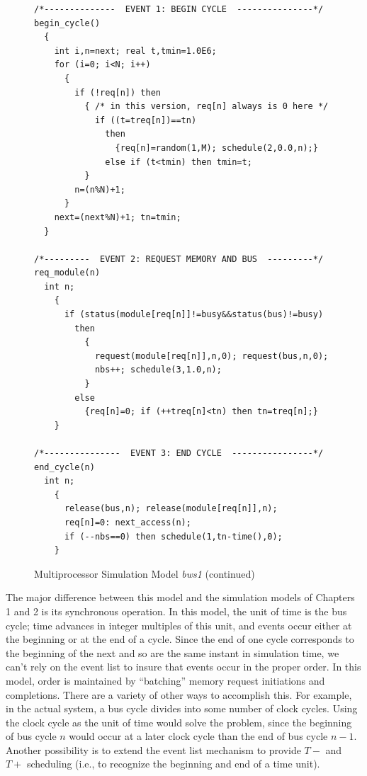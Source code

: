\addtocounter{figure}{-1}
\begin{figure}[p]
\centering
\begin{minipage}{.98\textwidth}
\begin{lstlisting}[basicstyle=\ttfamily\scriptsize]
/*--------------  EVENT 1: BEGIN CYCLE  ---------------*/
begin_cycle()
  {
    int i,n=next; real t,tmin=1.0E6;
    for (i=0; i<N; i++)
      {
        if (!req[n]) then
          { /* in this version, req[n] always is 0 here */
            if ((t=treq[n])==tn)
              then
                {req[n]=random(1,M); schedule(2,0.0,n);}
              else if (t<tmin) then tmin=t;
          }
        n=(n%N)+1;
      }
    next=(next%N)+1; tn=tmin;
  }

/*---------  EVENT 2: REQUEST MEMORY AND BUS  ---------*/
req_module(n)
  int n;
    {
      if (status(module[req[n]]!=busy&&status(bus)!=busy)
        then
          {
            request(module[req[n]],n,0); request(bus,n,0);
            nbs++; schedule(3,1.0,n);
          }
        else
          {req[n]=0; if (++treq[n]<tn) then tn=treq[n];}
    }

/*---------------  EVENT 3: END CYCLE  ----------------*/
end_cycle(n)
  int n;
    {
      release(bus,n); release(module[req[n]],n);
      req[n]=0: next_access(n);
      if (--nbs==0) then schedule(1,tn-time(),0);
    }
\end{lstlisting}
\end{minipage}
\caption{Multiprocessor Simulation Model \emph{bws1} (continued)}
\end{figure}

The major difference between this model and the simulation models of
Chapters 1 and 2 is its synchronous operation. In this model, the unit of time
is the bus cycle; time advances in integer multiples of this unit, and events
occur either at the beginning or at the end of a cycle. Since the end of one
cycle corresponds to the beginning of the next and so are the same instant in
simulation time, we can't rely on the event list to insure that events occur in
the proper order. In this model, order is maintained by ``batching'' memory
request initiations and completions. There are a variety of other ways to
accomplish this. For example, in the actual system, a bus cycle divides into
some number of clock cycles. Using the clock cycle as the unit of time would
solve the problem, since the beginning of bus cycle $n$ would occur at a later
clock cycle than the end of bus cycle $n-1$. Another possibility is to extend the
event list mechanism to provide $T-$ and $T+$ scheduling (i.e., to recognize the
beginning and end of a time unit).

